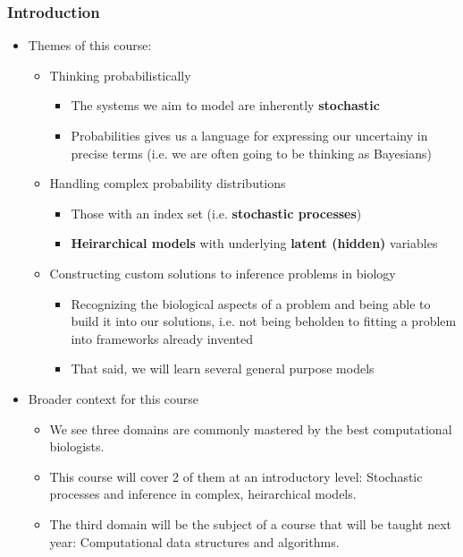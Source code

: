 \documentclass[12pt]{report}
\begin{document}
\subsubsection*{Introduction}
\label{sec-1-1-1}
\begin{itemize}
\item Themes of this course:
\label{sec-1-1-1-1}
\begin{itemize}
\item Thinking probabilistically
\label{sec-1-1-1-1-1}
\begin{itemize}
\item The systems we aim to model are inherently \textbf{stochastic}
\item Probabilities gives us a language for expressing our uncertainy in
precise terms (i.e. we are often going to be thinking as Bayesians)
\end{itemize}
\item Handling complex probability distributions
\label{sec-1-1-1-1-2}
\begin{itemize}
\item Those with an index set (i.e. \textbf{stochastic processes})
\item \textbf{Heirarchical models} with underlying \textbf{latent (hidden)} variables
\end{itemize}
\item Constructing custom solutions to inference problems in biology
\label{sec-1-1-1-1-3}
\begin{itemize}
\item Recognizing the biological aspects of a problem and being able to build it
into our solutions, i.e. not being beholden to fitting a problem into
frameworks already invented
\item That said, we will learn several general purpose models
\end{itemize}
\end{itemize}
\item Broader context for this course
\label{sec-1-1-1-2}
\begin{itemize}
\item We see three domains are commonly mastered by the best computational biologists.
\label{sec-1-1-1-2-1}
\item This course will cover 2 of them at an introductory level: Stochastic processes and inference in complex, heirarchical models.
\label{sec-1-1-1-2-2}
\item The third domain will be the subject of a course that will be taught next year: Computational data structures and algorithms.
\label{sec-1-1-1-2-3}
\end{itemize}
\end{itemize}
\end{document}
